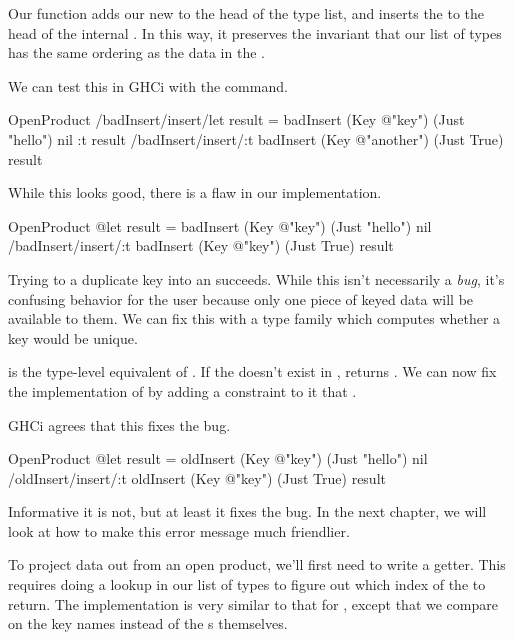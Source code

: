 \documentclass[book.tex]{subfiles}
\begin{document}

Our function  adds our new  to the head of the type
list, and inserts the  to the head of the internal . In this
way, it preserves the invariant that our list of types has the same ordering as
the data in the .

We can test this in GHCi with the  command.

\begin{dorepl}{OpenProduct}
/badInsert/insert/let result = badInsert (Key @"key") (Just "hello") nil
:t result
/badInsert/insert/:t badInsert (Key @"another") (Just True) result
\end{dorepl}

While this looks good, there is a flaw in our implementation.

\begin{dorepl}{OpenProduct}
@let result = badInsert (Key @"key") (Just "hello") nil
/badInsert/insert/:t badInsert (Key @"key") (Just True) result
\end{dorepl}

Trying to  a duplicate key into an  succeeds. While
this isn't necessarily a \emph{bug}, it's confusing behavior for the user
because only one piece of keyed data will be available to them. We can fix this
with a type family which computes whether a key would be unique.


 is the type-level equivalent of . If the  doesn't exist in ,  returns
. We can now fix the implementation of  by adding a
constraint to it that .


GHCi agrees that this fixes the bug.

\begin{dorepl}{OpenProduct}
@let result = oldInsert (Key @"key") (Just "hello") nil
/oldInsert/insert/:t oldInsert (Key @"key") (Just True) result
\end{dorepl}

Informative it is not, but at least it fixes the bug. In the next chapter, we
will look at how to make this error message much friendlier.

To project data out from an open product, we'll first need to write a getter.
This requires doing a lookup in our list of types to figure out which index of
the  to return. The implementation is very similar to that for
, except that we compare on the key names instead of the s
themselves.
\end{document}
